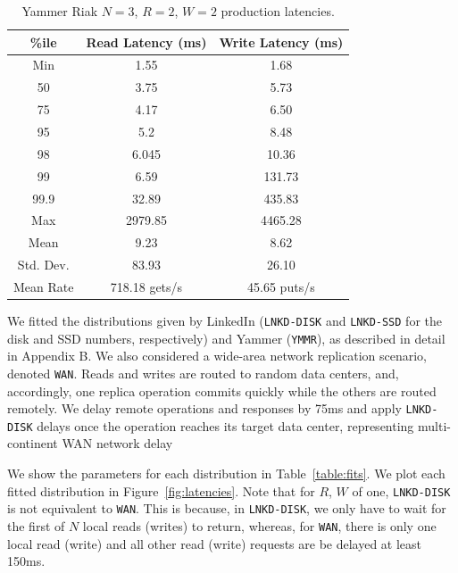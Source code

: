 \documentclass{vldb}
\begin{document}
\begin{table}
\centering
\begin{tabular}{|c|c|c|}
\hline
\%ile & Read Latency (ms) & Write Latency (ms)\\
\hline
Min & 1.55 & 1.68\\
50 & 3.75 & 5.73 \\
75 & 4.17 & 6.50\\
95 & 5.2 & 8.48\\
98 & 6.045 & 10.36 \\
99 & 6.59 & 131.73\\
99.9 & 32.89 & 435.83\\
Max & 2979.85 &  4465.28 \\
\hline
Mean & 9.23 & 8.62 \\
Std. Dev. & 83.93 & 26.10\\
\hline
Mean Rate & 718.18 gets/s & 45.65 puts/s\\
\hline
\end{tabular}
\vspace{-4pt}
\caption{Yammer Riak $N$$=$$3$, $R$$=$$2$, $W$$=$$2$ production latencies.}
\vspace{-6pt}
\label{table:yammer}
\end{table}

We fitted the distributions given by LinkedIn (\texttt{LNKD-DISK} and
\texttt{LNKD-SSD} for the disk and SSD numbers, respectively) and
Yammer (\texttt{YMMR}), as described in detail in Appendix B. We also
considered a wide-area network replication scenario, denoted
\texttt{WAN}.  Reads and writes are routed to random data centers,
and, accordingly, one replica operation commits quickly while the
others are routed remotely.  We delay remote operations and responses
by 75ms and apply \texttt{LNKD-DISK} delays once the operation reaches
its target data center, representing multi-continent WAN network
delay~\cite{dean-keynote}

We show the parameters for each distribution in
Table~\ref{table:fits}. We plot each fitted distribution in
Figure~\ref{fig:latencies}.  Note that for $R$, $W$ of one,
\texttt{LNKD-DISK} is not equivalent to \texttt{WAN}.  This is
because, in \texttt{LNKD-DISK}, we only have to wait for the first of
$N$ local reads (writes) to return, whereas, for \texttt{WAN}, there
is only one local read (write) and all other read (write) requests are
be delayed at least 150ms.
\end{document}
